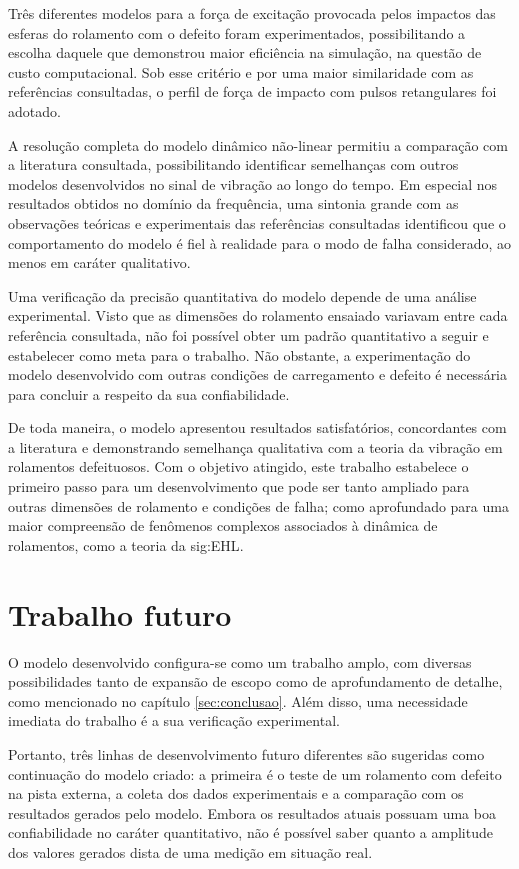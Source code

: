\documentclass[12pt,oneside,english,brazil,lmodern,siglas,simbolos,cite=num]{ucsmonograph}
\begin{document}
	Três diferentes modelos para a força de excitação provocada pelos impactos das esferas do rolamento com o defeito foram experimentados, possibilitando a escolha daquele que demonstrou maior eficiência na simulação, na questão de custo computacional.
	Sob esse critério e por uma maior similaridade com as referências consultadas, o perfil de força de impacto com pulsos retangulares foi adotado.
	
	A resolução completa do modelo dinâmico não-linear permitiu a comparação com a literatura consultada, possibilitando identificar semelhanças com outros modelos desenvolvidos no sinal de vibração ao longo do tempo.
	Em especial nos resultados obtidos no domínio da frequência, uma sintonia grande com as observações teóricas e experimentais das referências consultadas identificou que o comportamento do modelo é fiel à realidade para o modo de falha considerado, ao menos em caráter qualitativo.
	
	Uma verificação da precisão quantitativa do modelo depende de uma análise experimental.
	Visto que as dimensões do rolamento ensaiado variavam entre cada referência consultada, não foi possível obter um padrão quantitativo a seguir e estabelecer como meta para o trabalho.
	Não obstante, a experimentação do modelo desenvolvido com outras condições de carregamento e defeito é necessária para concluir a respeito da sua confiabilidade.
	
	De toda maneira, o modelo apresentou resultados satisfatórios, concordantes com a literatura e demonstrando semelhança qualitativa com a teoria da vibração em rolamentos defeituosos.
	Com o objetivo atingido, este trabalho estabelece o primeiro passo para um desenvolvimento que pode ser tanto ampliado para outras dimensões de rolamento e condições de falha; como aprofundado para uma maior compreensão de fenômenos complexos associados à dinâmica de rolamentos, como a teoria da \gls{sig:EHL}.
	
	\chapter{Trabalho futuro}
	O modelo desenvolvido configura-se como um trabalho amplo, com diversas possibilidades tanto de expansão de escopo como de aprofundamento de detalhe, como mencionado no capítulo \ref{sec:conclusao}.
	Além disso, uma necessidade imediata do trabalho é a sua verificação experimental.
	
	Portanto, três linhas de desenvolvimento futuro diferentes são sugeridas como continuação do modelo criado: a primeira é o teste de um rolamento com defeito na pista externa, a coleta dos dados experimentais e a comparação com os resultados gerados pelo modelo.
	Embora os resultados atuais possuam uma boa confiabilidade no caráter quantitativo, não é possível saber quanto a amplitude dos valores gerados dista de uma medição em situação real.
	
\end{document}
